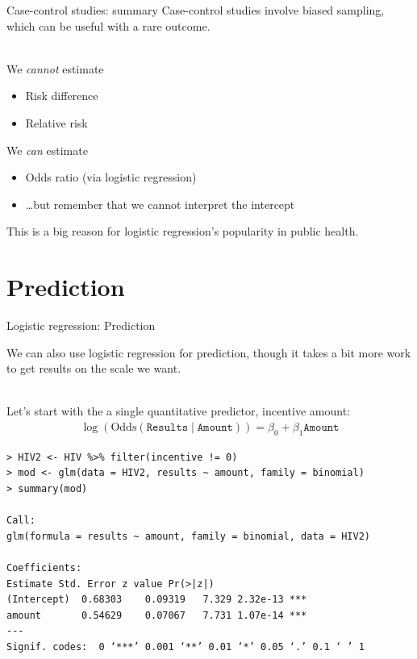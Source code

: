 \documentclass[10pt,t]{beamer}
\newcommand\tab[1][1cm]{\hspace*{#1}}
\begin{document}
\begin{frame}{Case-control studies: summary}
	Case-control studies involve biased sampling, which can be useful with a rare outcome. 
	\\ ~\ 
	
	We \textit{cannot} estimate
	\begin{itemize}
		\item Risk difference 
		\item Relative risk
	\end{itemize}
	\vspace{0.2cm}
	We \textit{can} estimate
	\begin{itemize}
		\item Odds ratio (via logistic regression)
		\item[] \tab \dots but remember that we cannot interpret the intercept
	\end{itemize}
	\vspace{0.2cm}
	This is a big reason for logistic regression's popularity in public health.  
\end{frame}

\section{Prediction}
\begin{frame}[fragile]{Logistic regression: Prediction}
\vspace{-5 mm}	
	
	We can also use logistic regression for prediction, though it takes a bit more work to get results on the scale we want. 
	\\ ~\
	
	Let's start with the a single quantitative predictor, incentive amount:
	\begin{align*}
		\log(\text{Odds}(\texttt{Results} \mid \texttt{Amount})) = \beta_0 + \beta_1 \texttt{Amount}
	\end{align*}
	\begin{center}
		\footnotesize
\begin{verbatim}
> HIV2 <- HIV %>% filter(incentive != 0)
> mod <- glm(data = HIV2, results ~ amount, family = binomial)
> summary(mod)

Call:
glm(formula = results ~ amount, family = binomial, data = HIV2)

Coefficients:
Estimate Std. Error z value Pr(>|z|)    
(Intercept)  0.68303    0.09319   7.329 2.32e-13 ***
amount       0.54629    0.07067   7.731 1.07e-14 ***
---
Signif. codes:  0 ‘***’ 0.001 ‘**’ 0.01 ‘*’ 0.05 ‘.’ 0.1 ‘ ’ 1
\end{verbatim}
\end{center}
\end{frame}
\end{document}
